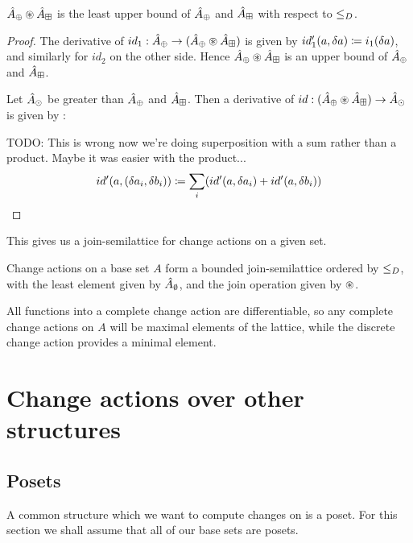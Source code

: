 \begin{corollary}
  $\hat{A}_\oplus \circledast \hat{A}_\boxplus$ is the least upper bound of $\hat{A}_\oplus$ and $\hat{A}_\boxplus$ with respect to $\leq_D$.
\end{corollary}
\ifproofs
\begin{proof}
  The derivative of $id_1: \hat{A}_\oplus \rightarrow (\hat{A}_\oplus \circledast
  \hat{A}_\boxplus)$ is given by $id_1'(a, \delta a) \coloneqq 
  i_1(\delta a)$, and similarly for $id_2$ on the other side. Hence $\hat{A}_\oplus \circledast \hat{A}_\boxplus$ 
  is an upper bound of $\hat{A}_\oplus$ and $\hat{A}_\boxplus$.

  Let $\hat{A}_\odot$ be greater than $\hat{A}_\oplus$ and $\hat{A}_\boxplus$.
  Then a
  derivative of $id: (\hat{A}_\oplus \circledast \hat{A}_\boxplus) \rightarrow \hat{A}_\odot$ is
  given by :

  TODO: This is wrong now we're doing superposition with a sum rather than a
  product. Maybe it was easier with the product...
  $$
  id'(a, (\delta a_i, \delta b_i)) \coloneqq 
    \sum_i (id'(a, \delta a_i) + id'(a, \delta b_i))
  $$
\end{proof}
\fi

This gives us a join-semilattice for change actions on a given set.

\begin{thm}
  Change actions on a base set $A$ form a bounded join-semilattice 
  ordered by $\leq_D$, with the least element given by
  $\hat{A}_\emptyset$, and the join operation given by $\circledast$.
\end{thm}

All functions into a complete change action are differentiable, so any
complete change actions on $A$ will be maximal elements of the lattice, while
the discrete change action provides a minimal element.

\section{Change actions over other structures}
\label{sec:moreStructures}

\subsection{Posets}

A common structure which we want to compute changes on is a poset. For this
section we shall assume that all of our base sets are posets.

